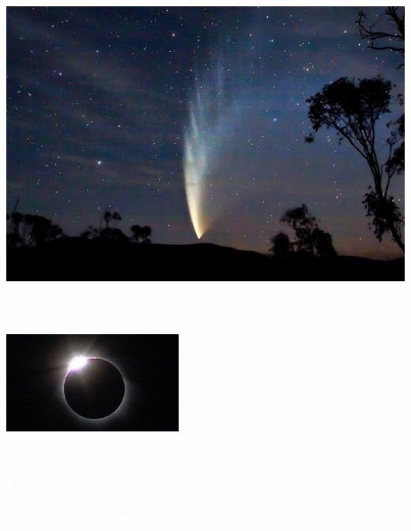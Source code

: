 \documentclass[aspectratio=169,xcolor=pdftex,dvipsnames]{beamer} %
\begin{document}

{
{
    \includegraphics[width=\paperwidth,height=\paperheight]{comet.jpg}
}
\begin{frame}
\frametitle{\textcolor{white}{Prehistoric times: comets}}
 
\end{frame}
}

{
{
    \includegraphics[width=\paperwidth]{solarEclipse.jpg}
}
\begin{frame}
\frametitle{\textcolor{white}{Prehistoric times: solar eclipses\\
First records:\\
772 BCE, China\\
750 BCE, Babylon}}
 
\end{frame}
}

\end{document}
